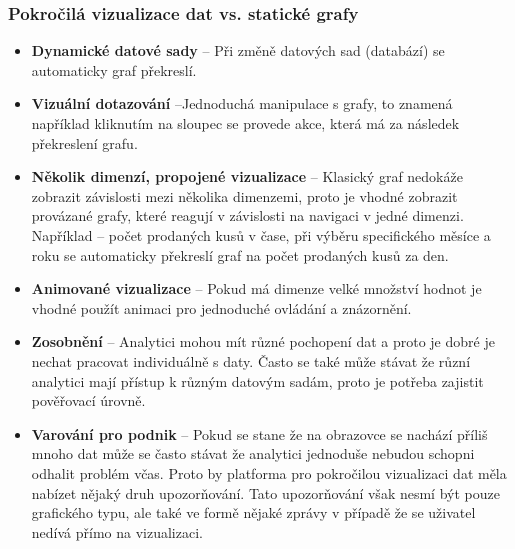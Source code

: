 \subsubsection{Pokročilá vizualizace dat vs. statické grafy}
\begin{itemize}
\item \textbf{Dynamické datové sady} -- Při změně datových sad (databází) se automaticky graf překreslí.
\item \textbf{Vizuální dotazování} --Jednoduchá manipulace s grafy, to znamená například kliknutím na sloupec se provede akce, která má za následek překreslení grafu.
\item \textbf{Několik dimenzí, propojené vizualizace} -- Klasický graf nedokáže zobrazit závislosti mezi několika dimenzemi, proto je vhodné zobrazit provázané grafy, které reagují v závislosti na navigaci v jedné dimenzi. Například -- počet prodaných kusů v čase, při výběru specifického měsíce a roku se automaticky překreslí graf na počet prodaných kusů za den.
\item \textbf{Animované vizualizace} -- Pokud má dimenze velké množství hodnot je vhodné použít animaci pro jednoduché ovládání a znázornění.
\item \textbf{Zosobnění} -- Analytici mohou mít různé pochopení dat a proto je dobré je nechat pracovat individuálně s daty. Často se také může stávat že různí analytici mají přístup k různým datovým sadám, proto je potřeba zajistit pověřovací úrovně.
\item \textbf{Varování pro podnik} -- Pokud se stane že na obrazovce se nachází příliš mnoho dat může se často stávat že analytici jednoduše nebudou schopni odhalit problém včas. Proto by platforma pro pokročilou vizualizaci dat měla nabízet nějaký druh upozorňování. Tato upozorňování však nesmí být pouze grafického typu, ale také ve formě nějaké zprávy v případě že se uživatel nedívá přímo na vizualizaci. \cite{advanced-data-vizualization-platforms}
\end{itemize}

